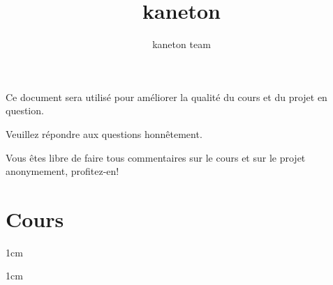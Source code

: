 %
%
%
%
%
%

%
%

\def\path{../..}

%
%



%
%


%
%

\title{kaneton}

%
%

\author{\small{kaneton team}}

%
%



%
%

\maketitle

%
%

\begin{center}

\scriptsize{Ce document sera utilis\'e pour am\'eliorer la qualit\'e du
  cours et du projet en question.}

\scriptsize{Veuillez r\'epondre aux questions honn\^etement.}

\scriptsize{Vous \^etes libre de faire tous commentaires sur le cours
  et sur le projet anonymement, profitez-en!}

\end{center}

%
%

%
%

\section{Cours}

         {1cm}

         {1cm}

